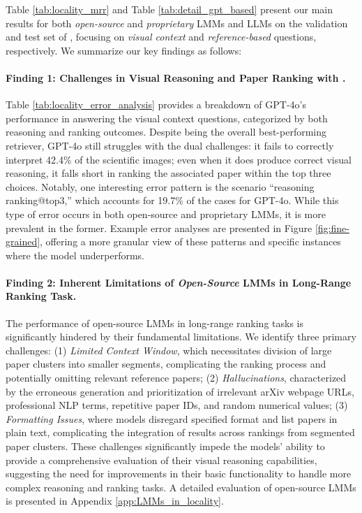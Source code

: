 \label{main_result}
Table \ref{tab:locality_mrr} and Table \ref{tab:detail_gpt_based} present our main results for both \emph{open-source} and \emph{proprietary} LMMs and LLMs on the validation and test set of \data, focusing on \emph{visual context} and \emph{reference-based} questions, respectively. 
%
We summarize our key findings as follows:


\paragraph{Finding 1: Challenges in Visual Reasoning and Paper Ranking with \data.}
%
Table \ref{tab:locality_error_analysis} provides a breakdown of GPT-4o's performance in answering the visual context questions, categorized by both reasoning and ranking outcomes. 
%
Despite being the overall best-performing retriever, GPT-4o still struggles with the dual challenges: it fails to correctly interpret 42.4\% of the scientific images; even when it does produce correct visual reasoning, it falls short in ranking the associated paper within the top three choices. 
%
Notably, one interesting error pattern is the scenario ``\xmark reasoning \cmark ranking@top3,'' which accounts for 19.7\% of the cases for GPT-4o. 
%
While this type of error occurs in both open-source and proprietary LMMs, it is more prevalent in the former.
%
Example error analyses are presented in Figure \ref{fig:fine-grained}, offering a more granular view of these patterns and specific instances where the model underperforms. 






\paragraph{Finding 2: Inherent Limitations of \emph{Open-Source} LMMs in Long-Range Ranking Task.}
%
The performance of open-source LMMs in long-range ranking tasks is significantly hindered by their fundamental limitations. We identify three primary challenges:
(1) \emph{Limited Context Window}, which necessitates division of large paper clusters into smaller segments, complicating the ranking process and potentially omitting relevant reference papers;
(2) \emph{Hallucinations}, characterized by the erroneous generation and prioritization of irrelevant arXiv webpage URLs, professional NLP terms, repetitive paper IDs, and random numerical values;
(3) \emph{Formatting Issues}, where models disregard specified format and list papers in plain text, complicating the integration of results across rankings from segmented paper clusters.
These challenges significantly impede the models' ability to provide a comprehensive evaluation of their visual reasoning capabilities, suggesting the need for improvements in their basic functionality to handle more complex reasoning and ranking tasks. A detailed evaluation of open-source LMMs is presented in Appendix \ref{app:LMMs_in_locality}. 




